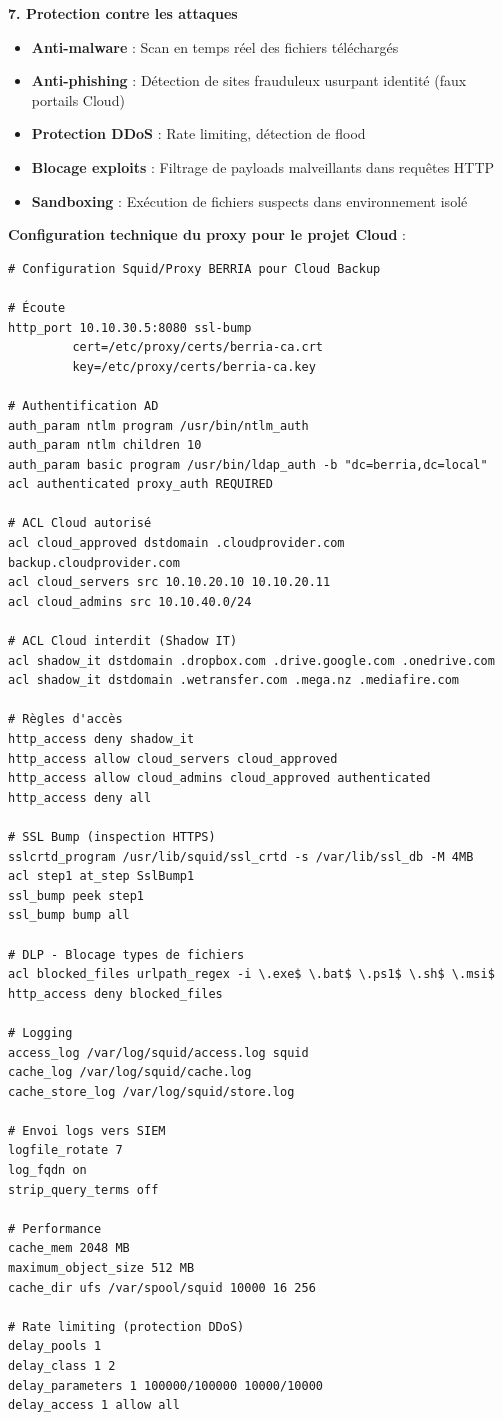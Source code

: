 \medskip

\noindent \textbf{7. Protection contre les attaques}
\begin{itemize}
  \item \textbf{Anti-malware} : Scan en temps réel des fichiers téléchargés
  \item \textbf{Anti-phishing} : Détection de sites frauduleux usurpant identité (faux portails Cloud)
  \item \textbf{Protection DDoS} : Rate limiting, détection de flood
  \item \textbf{Blocage exploits} : Filtrage de payloads malveillants dans requêtes HTTP
  \item \textbf{Sandboxing} : Exécution de fichiers suspects dans environnement isolé
\end{itemize}

\newpage

\noindent \textbf{Configuration technique du proxy pour le projet Cloud} :

\begin{verbatim}
# Configuration Squid/Proxy BERRIA pour Cloud Backup

# Écoute
http_port 10.10.30.5:8080 ssl-bump 
         cert=/etc/proxy/certs/berria-ca.crt 
         key=/etc/proxy/certs/berria-ca.key

# Authentification AD
auth_param ntlm program /usr/bin/ntlm_auth
auth_param ntlm children 10
auth_param basic program /usr/bin/ldap_auth -b "dc=berria,dc=local"
acl authenticated proxy_auth REQUIRED

# ACL Cloud autorisé
acl cloud_approved dstdomain .cloudprovider.com backup.cloudprovider.com
acl cloud_servers src 10.10.20.10 10.10.20.11
acl cloud_admins src 10.10.40.0/24

# ACL Cloud interdit (Shadow IT)
acl shadow_it dstdomain .dropbox.com .drive.google.com .onedrive.com
acl shadow_it dstdomain .wetransfer.com .mega.nz .mediafire.com

# Règles d'accès
http_access deny shadow_it
http_access allow cloud_servers cloud_approved
http_access allow cloud_admins cloud_approved authenticated
http_access deny all

# SSL Bump (inspection HTTPS)
sslcrtd_program /usr/lib/squid/ssl_crtd -s /var/lib/ssl_db -M 4MB
acl step1 at_step SslBump1
ssl_bump peek step1
ssl_bump bump all

# DLP - Blocage types de fichiers
acl blocked_files urlpath_regex -i \.exe$ \.bat$ \.ps1$ \.sh$ \.msi$
http_access deny blocked_files

# Logging
access_log /var/log/squid/access.log squid
cache_log /var/log/squid/cache.log
cache_store_log /var/log/squid/store.log

# Envoi logs vers SIEM
logfile_rotate 7
log_fqdn on
strip_query_terms off

# Performance
cache_mem 2048 MB
maximum_object_size 512 MB
cache_dir ufs /var/spool/squid 10000 16 256

# Rate limiting (protection DDoS)
delay_pools 1
delay_class 1 2
delay_parameters 1 100000/100000 10000/10000
delay_access 1 allow all
\end{verbatim}

